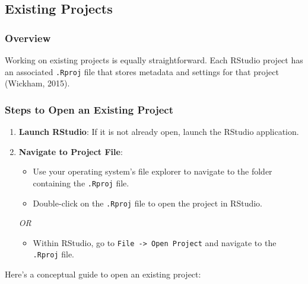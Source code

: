 \documentclass[
  b5paper]{book}
\providecommand{\tightlist}{%
  \setlength{\itemsep}{0pt}\setlength{\parskip}{0pt}}
\begin{document}
\hypertarget{existing-projects}{%
\subsection*{Existing Projects}\label{existing-projects}}

\hypertarget{overview-9}{%
\subsubsection*{Overview}\label{overview-9}}

Working on existing projects is equally straightforward. Each RStudio project has an associated \texttt{.Rproj} file that stores metadata and settings for that project (Wickham, 2015).

\hypertarget{steps-to-open-an-existing-project}{%
\subsubsection*{Steps to Open an Existing Project}\label{steps-to-open-an-existing-project}}

\begin{enumerate}
\def\labelenumi{\arabic{enumi}.}
\item
  \textbf{Launch RStudio}: If it is not already open, launch the RStudio application.
\item
  \textbf{Navigate to Project File}:

  \begin{itemize}
  \tightlist
  \item
    Use your operating system's file explorer to navigate to the folder containing the \texttt{.Rproj} file.
  \item
    Double-click on the \texttt{.Rproj} file to open the project in RStudio.
  \end{itemize}

  \emph{OR}

  \begin{itemize}
  \tightlist
  \item
    Within RStudio, go to \texttt{File\ -\textgreater{}\ Open\ Project} and navigate to the \texttt{.Rproj} file.
  \end{itemize}
\end{enumerate}

Here's a conceptual guide to open an existing project:
\end{document}
